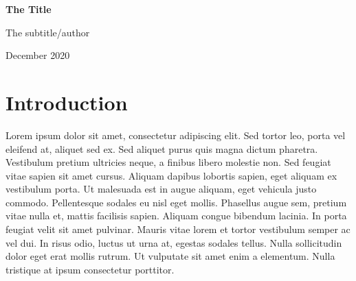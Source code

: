\documentclass[10pt]{article}
\begin{document}
\begin{center}
\begin{large}
\textbf{The Title}

\vspace{5pt}
\normalsize{The subtitle/author}

\vspace{5pt}
\normalsize{December 2020}

\noindent\makebox[\linewidth]{\rule{\textwidth}{0.4pt}}
\end{large}
\end{center}

\section{Introduction}

Lorem ipsum dolor sit amet, consectetur adipiscing elit. Sed tortor leo, porta
vel eleifend at, aliquet sed ex. Sed aliquet purus quis magna dictum pharetra.
Vestibulum pretium ultricies neque, a finibus libero molestie non. Sed feugiat
vitae sapien sit amet cursus. Aliquam dapibus lobortis sapien, eget aliquam ex
vestibulum porta. Ut malesuada est in augue aliquam, eget vehicula justo
commodo. Pellentesque sodales eu nisl eget mollis. Phasellus augue sem, pretium
vitae nulla et, mattis facilisis sapien. Aliquam congue bibendum lacinia. In
porta feugiat velit sit amet pulvinar. Mauris vitae lorem et tortor vestibulum
semper ac vel dui. In risus odio, luctus ut urna at, egestas sodales tellus.
Nulla sollicitudin dolor eget erat mollis rutrum. Ut vulputate sit amet enim a
elementum. Nulla tristique at ipsum consectetur porttitor.
\end{document}
